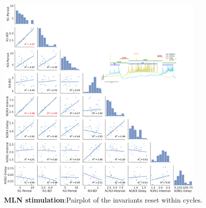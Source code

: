 \begin{figure}[htbp]
	\centering
	\includegraphics[width=0.9\textwidth]{./img/invariants/data/SUSSEX/MLN_driven/images/panel_with_pairplot.pdf}
	\caption{\textbf{MLN stimulation}:Pairplot of the invariants reset within cycles.}
	\label{fig:mln stimulation pairplot}
\end{figure}

\newpage
